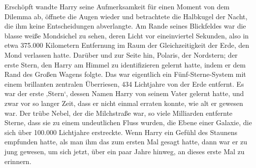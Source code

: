 Erschöpft wandte Harry seine Aufmerksamkeit für einen Moment von dem Dilemma ab, öffnete die Augen wieder und betrachtete die Halbkugel der Nacht, die ihm keine Entscheidungen abverlangte.
Am Rande seines Blickfeldes war die blasse weiße Mondsichel zu sehen, deren Licht vor eineinviertel Sekunden, also in etwa 375.000 Kilometern Entfernung im Raum der Gleichzeitigkeit der Erde, den Mond verlassen hatte.
Darüber und zur Seite hin, Polaris, der Nordstern; der erste Stern, den Harry am Himmel zu identifizieren gelernt hatte, indem er dem Rand des Großen Wagens folgte. Das war eigentlich ein Fünf-Sterne-System mit einem brillanten zentralen Überriesen, 434 Lichtjahre von der Erde entfernt. Es war der erste
‚Stern‘, dessen Namen Harry von seinem Vater gelernt hatte, und zwar vor so langer Zeit, dass er nicht einmal erraten konnte, wie alt er gewesen war.
Der trübe Nebel, der die Milchstraße war, so viele Milliarden entfernte Sterne, dass sie zu einem undeutlichen Fluss wurden, die Ebene einer Galaxie, die sich über 100.000 Lichtjahre erstreckte. Wenn Harry ein Gefühl des Staunens empfunden hatte, als man ihm das zum ersten Mal gesagt hatte, dann war er zu jung gewesen, um sich jetzt, über ein paar Jahre hinweg, an dieses erste Mal zu erinnern.

